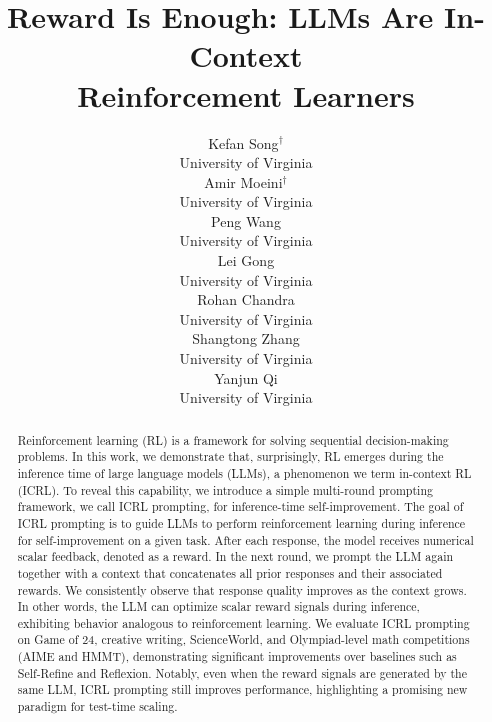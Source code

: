 \documentclass{article}
\title{Reward Is Enough: LLMs Are In-Context \\ Reinforcement Learners}
\author{
Kefan Song$^{\dagger}$ \\
University of Virginia \\
\And
Amir Moeini$^{\dagger}$ \\
University of Virginia \\
\And
Peng Wang \\
University of Virginia \\
\And Lei Gong \\
University of Virginia \\
\And Rohan Chandra \\
University of Virginia \\
\And Shangtong Zhang \\
University of Virginia \\
\And Yanjun Qi \\
University of Virginia \\
}
\newcommand{\0}{\mathbf{0}}
\begin{document}
\maketitle
\renewcommand{\thefootnote}{\fnsymbol{footnote}}
\renewcommand{\thefootnote}{\arabic{footnote}}
\begin{abstract}
Reinforcement learning (RL) is a framework for solving sequential decision-making problems. In this work, we demonstrate that, surprisingly, RL emerges during the inference time of large language models (LLMs),  a phenomenon we term in-context RL (ICRL). To reveal this capability, we introduce a simple multi-round prompting framework, we call ICRL prompting, for inference-time self-improvement. The goal of ICRL prompting is to guide LLMs to perform reinforcement learning during inference for self-improvement on a given task.
After each response, the model receives numerical scalar feedback, denoted as a reward. In the next round, we prompt the LLM again together with a context that concatenates all prior responses and their associated rewards. We consistently observe that response quality improves as the context grows. In other words, the LLM can optimize scalar reward signals during inference, exhibiting behavior analogous to reinforcement learning.
 We evaluate ICRL prompting on Game of 24, creative writing, ScienceWorld, and Olympiad-level math competitions (AIME and HMMT), demonstrating significant improvements over baselines such as Self-Refine and Reflexion. Notably, even when the reward signals are generated by the same LLM, ICRL prompting still improves performance, highlighting a promising new paradigm for test-time scaling.
\end{abstract}
\end{document}
